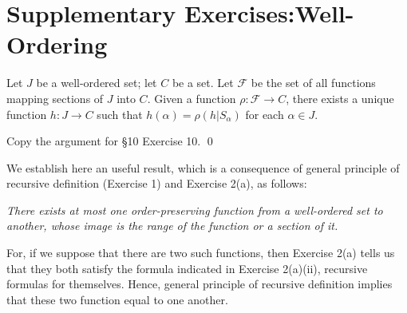 \documentclass[a4paper,12pt]{article}
\begin{document}
\section*{Supplementary Exercises:\;Well-Ordering}
\setcounter{exe}{0}
\begin{exe}
	Let \( J \) be a well-ordered set;
	let \( C \) be a set.
	Let \( \mathcal{F} \) be the set of all functions mapping sections of \( J \) into \( C \).
	Given a function \( \rho : \mathcal{F} \to C\),
	there exists a unique function \( h:J \to C \)
	such that
	\( h(\alpha) = \rho(h | S_{\alpha}) \)
	for each \( \alpha \in J \).
\end{exe}
\begin{sol}
	Copy the argument for \S10 Exercise 10.
	\qed\end{sol}

\begin{rem}\label{note:unique_order_preserving}
	We establish here an useful result,
	which is a consequence of general principle of recursive definition (Exercise 1) and 
	Exercise 2(a), as follows:\leavevmode \par
	\textit{There exists at most one order-preserving function from a well-ordered set to another, whose image is the range of the function or a section of it.}
	
	For, if we suppose that there are two such functions, then Exercise 2(a) tells us that they both satisfy the formula indicated in Exercise 2(a)(ii),
	recursive formulas for themselves.
	Hence, general principle of recursive definition implies that 
	these two function equal to one another.
\end{rem}
\end{document}
